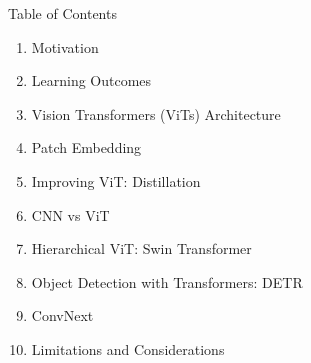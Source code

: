 \begin{frame}[allowframebreaks]{Table of Contents}
\begin{enumerate}
    \item Motivation
    \item Learning Outcomes
    \item Vision Transformers (ViTs) Architecture
    \item Patch Embedding
    \item Improving ViT: Distillation
    \item CNN vs ViT
    \item Hierarchical ViT: Swin Transformer
    \item Object Detection with Transformers: DETR
    \item ConvNext
    \item Limitations and Considerations
\end{enumerate}
\end{frame}